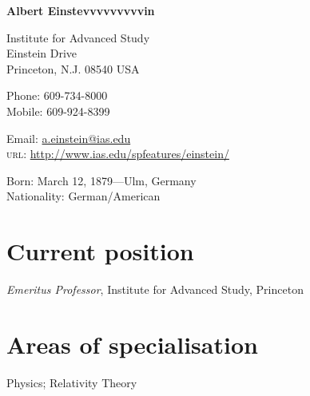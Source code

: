 \documentclass[11pt]{article} %
\begin{document}

{\LARGE\bfseries Albert Einstevvvvvvvvvin} %
\bigskip\bigskip\medskip %

Institute for Advanced Study\\ %
Einstein Drive\\ Princeton, N.J. 08540 USA
\medskip %

Phone: 609-734-8000\\ %
Mobile: 609-924-8399 %
\medskip %

Email: \href{mailto:a.einstein@ias.edu}{a.einstein@ias.edu}\\ %
\textsc{url}: \href{http://www.ias.edu/spfeatures/einstein/}{http://www.ias.edu/spfeatures/einstein/}\\ %

\vspace{0.06\textheight} %


Born: March 12, 1879---Ulm, Germany\\ %
Nationality: German/American %


\section*{Current position}

\emph{Emeritus Professor}, Institute for Advanced Study, Princeton %


\section*{Areas of specialisation}

Physics; Relativity Theory %

\end{document}
